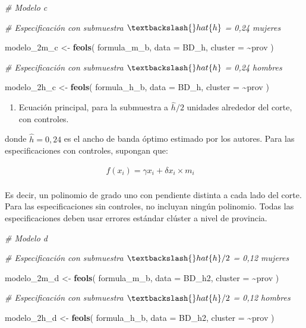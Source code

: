 \documentclass[
]{article}
\newenvironment{Shaded}{\begin{snugshade}}{\end{snugshade}}
\newcommand{\AttributeTok}[1]{\textcolor[rgb]{0.13,0.29,0.53}{#1}}
\newcommand{\CommentTok}[1]{\textcolor[rgb]{0.56,0.35,0.01}{\textit{#1}}}
\newcommand{\FunctionTok}[1]{\textcolor[rgb]{0.13,0.29,0.53}{\textbf{#1}}}
\newcommand{\NormalTok}[1]{#1}
\newcommand{\OtherTok}[1]{\textcolor[rgb]{0.56,0.35,0.01}{#1}}
\newcommand{\SpecialCharTok}[1]{\textcolor[rgb]{0.81,0.36,0.00}{\textbf{#1}}}
\providecommand{\tightlist}{%
  \setlength{\itemsep}{0pt}\setlength{\parskip}{0pt}}
\begin{document}
\begin{Shaded}
\begin{Highlighting}[]
\CommentTok{\# Modelo c}

\CommentTok{\# Especificación con submuestra $\textbackslash{}hat\{h\}$ = 0,24 mujeres}

\NormalTok{modelo\_2m\_c }\OtherTok{\textless{}{-}} \FunctionTok{feols}\NormalTok{(}
\NormalTok{  formula\_m\_b,}
  \AttributeTok{data =}\NormalTok{ BD\_h,}
  \AttributeTok{cluster =} \SpecialCharTok{\textasciitilde{}}\NormalTok{prov}
\NormalTok{)}

\CommentTok{\# Especificación con submuestra $\textbackslash{}hat\{h\}$ = 0,24 hombres}

\NormalTok{modelo\_2h\_c }\OtherTok{\textless{}{-}} \FunctionTok{feols}\NormalTok{(}
\NormalTok{  formula\_h\_b,}
  \AttributeTok{data =}\NormalTok{ BD\_h,}
  \AttributeTok{cluster =} \SpecialCharTok{\textasciitilde{}}\NormalTok{prov}
\NormalTok{)}
\end{Highlighting}
\end{Shaded}

\begin{enumerate}
\def\labelenumi{\alph{enumi})}
\setcounter{enumi}{3}
\tightlist
\item
  Ecuación principal, para la submuestra a \(\hat{h}/2\) unidades
  alrededor del corte, con controles.
\end{enumerate}

donde \(\hat{h}=0,24\) es el ancho de banda óptimo estimado por los
autores. Para las especificaciones con controles, supongan que:

\begin{align}
f(x_i)=\gamma x_i+\delta x_i×m_i \quad \nonumber \\
\end{align}

Es decir, un polinomio de grado uno con pendiente distinta a cada lado
del corte. Para las especificaciones sin controles, no incluyan ningún
polinomio. Todas las especificaciones deben usar errores estándar
clúster a nivel de provincia.

\begin{Shaded}
\begin{Highlighting}[]
\CommentTok{\# Modelo d}

\CommentTok{\# Especificación con submuestra $\textbackslash{}hat\{h\}/2$ = 0,12 mujeres}

\NormalTok{modelo\_2m\_d }\OtherTok{\textless{}{-}} \FunctionTok{feols}\NormalTok{(}
\NormalTok{  formula\_m\_b,}
  \AttributeTok{data =}\NormalTok{ BD\_h2,}
  \AttributeTok{cluster =} \SpecialCharTok{\textasciitilde{}}\NormalTok{prov}
\NormalTok{)}

\CommentTok{\# Especificación con submuestra $\textbackslash{}hat\{h\}/2$ = 0,12 hombres}

\NormalTok{modelo\_2h\_d }\OtherTok{\textless{}{-}} \FunctionTok{feols}\NormalTok{(}
\NormalTok{  formula\_h\_b,}
  \AttributeTok{data =}\NormalTok{ BD\_h2,}
  \AttributeTok{cluster =} \SpecialCharTok{\textasciitilde{}}\NormalTok{prov}
\NormalTok{)}
\end{Highlighting}
\end{Shaded}
\end{document}
